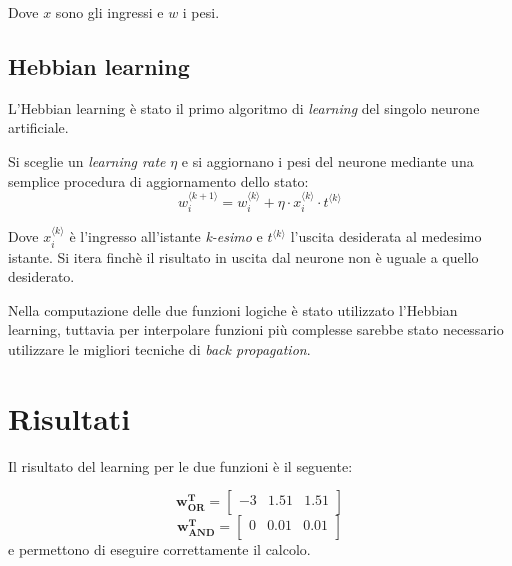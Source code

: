 \documentclass[12pt]{article}
\begin{document}
Dove $x$ sono gli ingressi e $w$ i pesi.

\subsection{Hebbian learning}
L'Hebbian learning è stato il primo algoritmo di \emph{learning} del singolo neurone artificiale.

Si sceglie un \emph{learning rate} $ \eta $ e si aggiornano i pesi del neurone mediante una semplice procedura di aggiornamento dello stato:
$$ w_{i}^{\langle k+1 \rangle} = w_i^{\langle k \rangle} + \eta \cdot x_i^{ \langle k \rangle} \cdot t^{ \langle k \rangle } $$

Dove $x_i^{ \langle k \rangle}$ è l'ingresso all'istante \emph{k-esimo} e $t^{\langle k \rangle}$ l'uscita desiderata al medesimo istante. Si itera finchè il risultato in uscita dal neurone non è  uguale a quello desiderato.

Nella computazione delle due funzioni logiche è stato utilizzato l'Hebbian learning, tuttavia per interpolare funzioni più complesse sarebbe stato necessario utilizzare le migliori tecniche di \emph{back propagation}.

\section{Risultati}
Il risultato del learning per le due funzioni è il seguente:

$$
\mathbf{w_{OR}^T} = 
\begin{bmatrix}
-3  &    1.51 &  1.51 \\
\end{bmatrix}
$$
$$
\mathbf{w_{AND}^T} = 
\begin{bmatrix}
0   &    0.01 &   0.01 \\
\end{bmatrix}
$$
e permettono di eseguire correttamente il calcolo.
\end{document}
